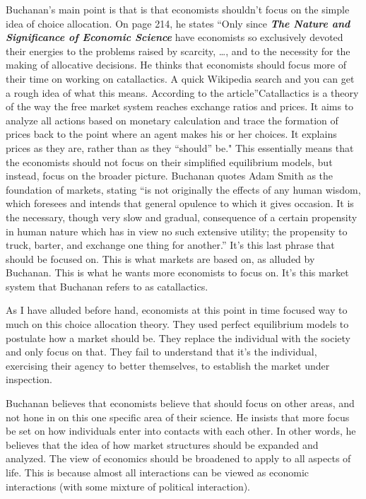 \documentclass[11pt,]{article}
\begin{document}
Buchanan's main point is that is that economists shouldn't focus on the
simple idea of choice allocation. On page 214, he states ``Only since
\textbf{\emph{The Nature and Significance of Economic Science}} have
economists so exclusively devoted their energies to the problems raised
by scarcity, \ldots{}, and to the necessity for the making of allocative
decisions. He thinks that economists should focus more of their time on
working on catallactics. A quick Wikipedia search and you can get a
rough idea of what this means. According to the article''Catallactics is
a theory of the way the free market system reaches exchange ratios and
prices. It aims to analyze all actions based on monetary calculation and
trace the formation of prices back to the point where an agent makes his
or her choices. It explains prices as they are, rather than as they
``should'' be." This essentially means that the economists should not
focus on their simplified equilibrium models, but instead, focus on the
broader picture. Buchanan quotes Adam Smith as the foundation of
markets, stating ``is not originally the effects of any human wisdom,
which foresees and intends that general opulence to which it gives
occasion. It is the necessary, though very slow and gradual, consequence
of a certain propensity in human nature which has in view no such
extensive utility; the propensity to truck, barter, and exchange one
thing for another.'' It's this last phrase that should be focused on.
This is what markets are based on, as alluded by Buchanan. This is what
he wants more economists to focus on. It's this market system that
Buchanan refers to as catallactics.

As I have alluded before hand, economists at this point in time focused
way to much on this choice allocation theory. They used perfect
equilibrium models to postulate how a market should be. They replace the
individual with the society and only focus on that. They fail to
understand that it's the individual, exercising their agency to better
themselves, to establish the market under inspection.

Buchanan believes that economists believe that should focus on other
areas, and not hone in on this one specific area of their science. He
insists that more focus be set on how individuals enter into contacts
with each other. In other words, he believes that the idea of how market
structures should be expanded and analyzed. The view of economics should
be broadened to apply to all aspects of life. This is because almost all
interactions can be viewed as economic interactions (with some mixture
of political interaction).
\end{document}
